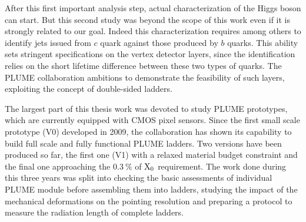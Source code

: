 After this first important analysis step, actual characterization of the Higgs boson can start. 
But this second study was beyond the scope of this work even if it is strongly related to our goal. 
Indeed this characterization requires among others to identify jets issued from $c$ quark against those produced by $b$ quarks. 
This ability sets stringent specifications on the vertex detector layers, since the identification relies on the short lifetime difference between these two types of quarks. 
The \gls{PLUME} collaboration ambitions to demonstrate the feasibility of such layers, exploiting the concept of double-sided ladders.



The largest part of this thesis work was devoted to study \gls{PLUME} prototypes, which are currently equipped with \gls{CMOS} pixel sensors.
Since the first small scale prototype (V0) developed in 2009, the collaboration has shown its capability to build full scale and fully functional \gls{PLUME} ladders.
Two versions have been produced so far, the first one (V1) with a relaxed material budget constraint and the final one approaching the $0.3~\%$ of $\rm{X_{0}}$ requirement.
The work done during this three years was split into checking the basic assessments of individual \gls{PLUME} module before assembling them into ladders, studying the impact of the mechanical deformations on the pointing resolution and preparing a protocol to measure the radiation length of complete ladders.

